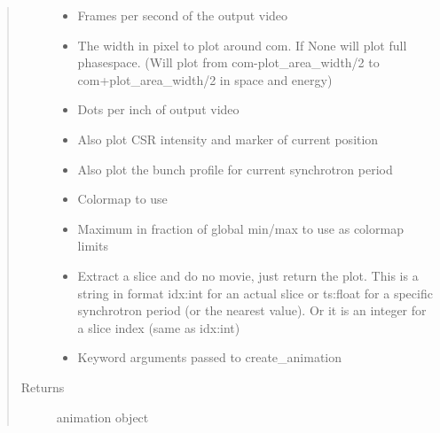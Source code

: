 \documentclass[letterpaper,10pt,openany,oneside,english]{sphinxmanual}
\begin{document}
\begin{fulllineitems}
\begin{fulllineitems}
\begin{quote}
\begin{description}
\begin{itemize}
\item {} 
 \textendash{} Frames per second of the output video

\item {} 
 \textendash{} The width in pixel to plot around com. If None will plot full  
phasespace. (Will plot from com-plot\_area\_width/2 to com+plot\_area\_width/2  
in space and energy)

\item {} 
 \textendash{} Dots per inch of output video

\item {} 
 \textendash{} Also plot CSR intensity and marker of current position

\item {} 
 \textendash{} Also plot the bunch profile for current synchrotron period

\item {} 
 \textendash{} Colormap to use

\item {} 
 \textendash{} Maximum in fraction of global min/max to use as colormap limits

\item {} 
 \textendash{} Extract a slice and do no movie, just return the plot. This is a  
string in format idx:int for an actual slice or ts:float for a specific synchrotron  
period (or the nearest value). Or it is an integer for a slice index  
(same as idx:int)

\item {} 
 \textendash{} 
Keyword arguments passed to create\_animation


\end{itemize}

\item[{Returns}] \leavevmode
animation object

\end{description}\end{quote}

\end{fulllineitems}



\end{fulllineitems}
\end{document}
